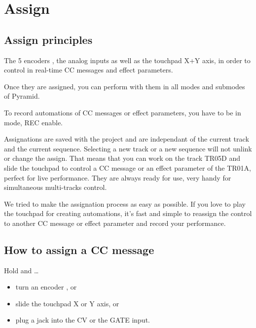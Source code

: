 \chapter{Assign}

\section{Assign principles}

The 5 encoders \encodersicon{}, the analog inputs as well as the touchpad \touchpadicon{} X+Y axis, in order to control in real-time CC messages and effect parameters.

Once they are assigned, you can perform with them in all modes and submodes of Pyramid.

To record automations of CC messages or effect parameters, you have to be in  mode, REC enable.

Assignations are saved with the project and are independant of the current track and the current sequence. Selecting a new track or a new sequence will not unlink or change the assign. That means that you can work on the track TR05D and slide the touchpad to control a CC message or an effect parameter of the TR01A, perfect for live performance. They are always ready for use, very handy for simultaneous multi-tracks control.

We tried to make the assignation process as easy as possible. If you love to play the touchpad for creating automations, it's fast and simple to reassign the control to another CC message or effect parameter and record your performance.




\section{How to assign a CC message}

Hold  and \ldots

\begin{itemize}
\item turn an encoder \encodersicon{}, or
\item slide the touchpad \touchpadicon{} X or Y axis, or
\item plug a jack into the CV or the GATE input.
\end{itemize}

